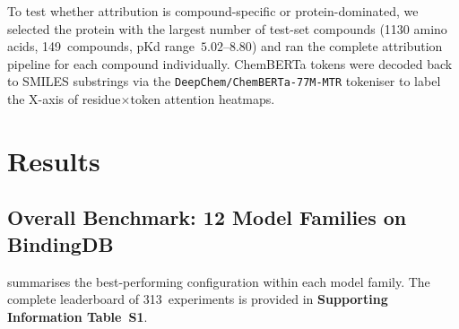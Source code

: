 \documentclass[11pt,twocolumn]{article}
\begin{document}
To test whether attribution is compound-specific or protein-dominated, we
selected the protein with the largest number of test-set compounds (1130
amino acids, 149~compounds, pKd range~$5.02$--$8.80$) and ran the complete
attribution pipeline for each compound individually.  ChemBERTa tokens were
decoded back to SMILES substrings via the \texttt{DeepChem/ChemBERTa-77M-MTR}
tokeniser to label the X-axis of residue$\times$token attention heatmaps.

\section{Results}

\subsection{Overall Benchmark: 12 Model Families on BindingDB}
\label{sec:overall}

 summarises the best-performing configuration within
each model family.  The complete leaderboard of 313~experiments is provided in
\textbf{Supporting Information Table~S1}.
\end{document}
